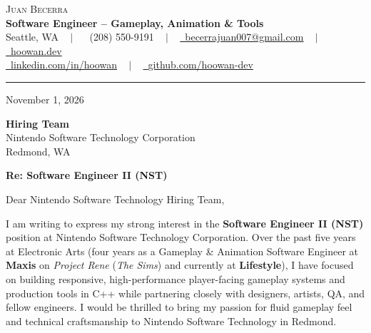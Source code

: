 \documentclass[letterpaper,11pt]{article}
\begin{document}
\begin{center}
    {\Huge \scshape Juan Becerra} \\ \vspace{4pt}
    \textbf{\large Software Engineer -- Gameplay, Animation \& Tools} \\ \vspace{4pt}
    \small Seattle, WA ~ $|$ ~
    \raisebox{-0.1\height}\faPhone\ (208) 550-9191 ~ $|$ ~
    \href{mailto:becerrajuan007@gmail.com}{\raisebox{-0.2\height}\faEnvelope\ \underline{becerrajuan007@gmail.com}} ~ $|$ ~
    \href{https://hoowan.dev}{\raisebox{-0.2\height}\faGlobe\ \underline{hoowan.dev}} \\ \vspace{2pt}
    \href{https://linkedin.com/in/hoowan/}{\raisebox{-0.2\height}\faLinkedin\ \underline{linkedin.com/in/hoowan}} ~ $|$ ~
    \href{https://github.com/hoowan-dev}{\raisebox{-0.2\height}\faGithub\ \underline{github.com/hoowan-dev}}
\end{center}

\vspace{4pt}
\hrule
\vspace{14pt}

\noindent November 1, 2026

\vspace{8pt}
\noindent \textbf{Hiring Team} \\
Nintendo Software Technology Corporation \\
Redmond, WA

\vspace{8pt}
\noindent \textbf{Re: Software Engineer II (NST)}

\vspace{8pt}
\noindent Dear Nintendo Software Technology Hiring Team,

I am writing to express my strong interest in the \textbf{Software Engineer II (NST)} position at 
Nintendo Software Technology Corporation. Over the past five years at Electronic Arts (four years 
as a Gameplay \& Animation Software Engineer at \textbf{Maxis} on \emph{Project Rene} (\emph{The Sims}) 
and currently at \textbf{Lifestyle}), I have focused on building responsive, high-performance 
player-facing gameplay systems and production tools in C++ while partnering closely with designers, 
artists, QA, and fellow engineers. I would be thrilled to bring my passion for fluid gameplay feel 
and technical craftsmanship to Nintendo Software Technology in Redmond.
\end{document}
